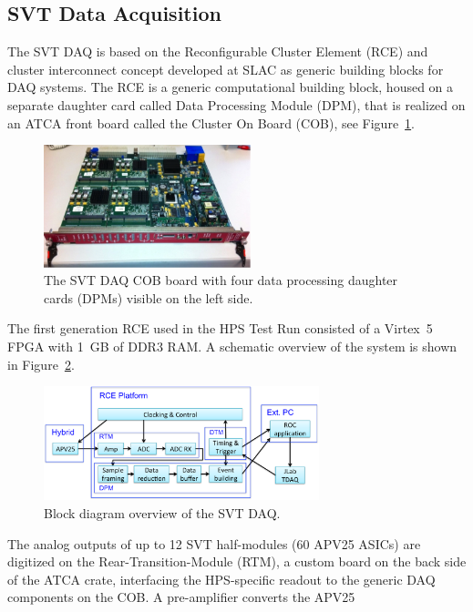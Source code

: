 \documentclass[final,3p,times,twocolumn]{elsarticle}
\begin{document}
\subsection{SVT Data Acquisition}
\label{sec:svt_daq}
The SVT DAQ is based on the Reconfigurable Cluster Element (RCE) and cluster 
interconnect concept developed at SLAC as generic building blocks for DAQ systems. 
The RCE is a generic computational building block, housed on a separate daughter card called 
Data Processing Module (DPM), that is realized on an ATCA front board called the Cluster On Board 
(COB), see Figure~\ref{fig:cob}.
 \begin{figure}[]
\begin{center}
{\small
	\includegraphics[width=6cm]{figures/svt_daq_module}
	\caption{The SVT DAQ COB board with four data processing daughter cards (DPMs) visible on the left side.}
	\label{fig:cob}
}
\end{center}
\end{figure}
The first generation RCE used in the HPS Test Run consisted of a Virtex~5 FPGA with 1~GB of DDR3 RAM. 
A schematic overview of the system is shown in Figure~\ref{fig:svtdaq}. 
 \begin{figure}[]
\begin{center}
{\small
	\includegraphics[width=8cm]{figures/svt-daq-sketch}
	\caption{Block diagram overview of the SVT DAQ.}
	\label{fig:svtdaq}
}
\end{center}
\end{figure}
The analog outputs of up to 12 SVT half-modules (60 APV25 ASICs) are digitized on the 
Rear-Transition-Module (RTM), a custom board on the back side of the ATCA crate, interfacing the 
HPS-specific readout to the generic DAQ components on the COB. A pre-amplifier converts the APV25 
\end{document}
